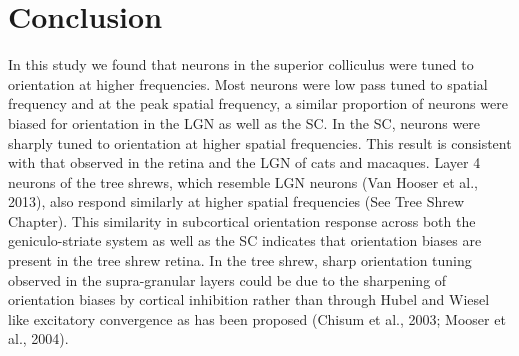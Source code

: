 	\section{Conclusion}
	In this study we found that neurons in the superior colliculus were tuned to orientation at higher frequencies. Most neurons were low pass tuned to spatial frequency and at the peak spatial frequency, a similar proportion of neurons were biased for orientation in the LGN as well as the SC. In the SC, neurons were sharply tuned to orientation at higher spatial frequencies. This result is consistent with that observed in the retina and the LGN of cats and macaques. Layer 4 neurons of the tree shrews, which resemble LGN neurons (Van Hooser et al., 2013), also respond similarly at higher spatial frequencies (See Tree Shrew Chapter). This similarity in subcortical orientation response across both the geniculo-striate system as well as the SC indicates that orientation biases are present in the tree shrew retina. In the tree shrew, sharp orientation tuning observed in the supra-granular layers could be due to the sharpening of orientation biases by cortical inhibition rather than through Hubel and Wiesel like excitatory convergence as has been proposed (Chisum et al., 2003; Mooser et al., 2004).
	